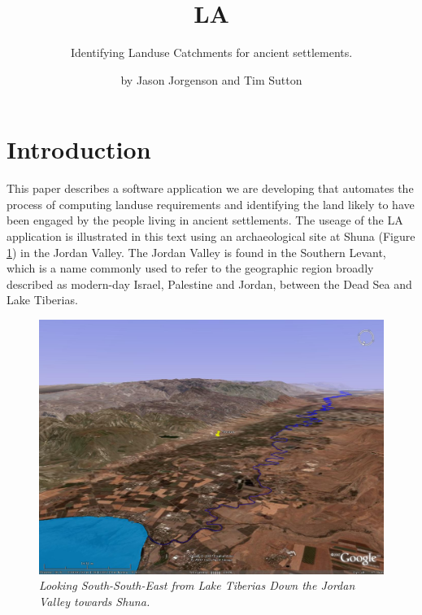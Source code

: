 

\title{LA} \subtitle{Identifying Landuse Catchments for 
ancient settlements.}
\author{by Jason Jorgenson and Tim Sutton}
\maketitle
\section{Introduction} \label{sec:Introduction}
  This paper describes a software application we are developing that automates
  the process of computing landuse requirements and identifying the land likely 
  to have been engaged by the people living in ancient settlements.
  The useage of the LA application is illustrated in this text using an
  archaeological site at Shuna (Figure \ref{fig:shunaGoogleEarth}) in the
  Jordan Valley.  The Jordan Valley is found in the Southern Levant, which is a name
  commonly used to refer to the geographic region broadly described as
  modern-day Israel, Palestine and Jordan, between the Dead Sea and Lake Tiberias.
\begin{figure}[htbp] %
  \includegraphics[scale=0.17]{./images/ShunaGoogleEarth3D.jpg}
  \caption{\label{fig:shunaGoogleEarth}\textit{Looking South-South-East from Lake
    Tiberias Down the Jordan Valley towards Shuna.}} 
\end{figure}
